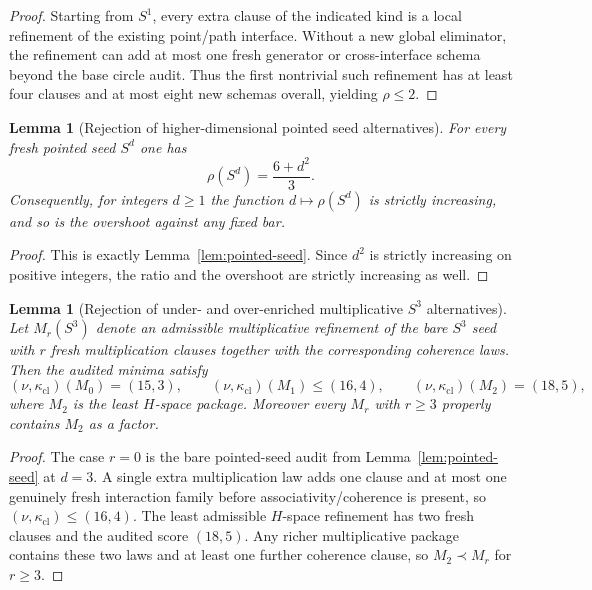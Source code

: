 \documentclass{lmcs}
\theoremstyle{plain}
\newtheorem{lem}[thm]{Lemma}
\theoremstyle{definition}
\theoremstyle{remark}
\begin{document}
\begin{proof}
Starting from $S^1$, every extra clause of the indicated kind is a local refinement of the existing point/path interface.
Without a new global eliminator, the refinement can add at most one fresh generator or cross-interface schema beyond the base circle audit.
Thus the first nontrivial such refinement has at least four clauses and at most eight new schemas overall, yielding $\rho\le 2$.
\end{proof}

\begin{lem}[Rejection of higher-dimensional pointed seed alternatives]
\label{lem:reject-pointed}
For every fresh pointed seed $S^d$ one has
\[
  \rho(S^d)=\frac{6+d^2}{3}.
\]
Consequently, for integers $d\ge 1$ the function $d\mapsto \rho(S^d)$ is strictly increasing, and so is the overshoot against any fixed bar.
\end{lem}

\begin{proof}
This is exactly Lemma~\ref{lem:pointed-seed}.
Since $d^2$ is strictly increasing on positive integers, the ratio and the overshoot are strictly increasing as well.
\end{proof}

\begin{lem}[Rejection of under- and over-enriched multiplicative $S^3$ alternatives]
\label{lem:reject-multiplicative}
Let $M_r(S^3)$ denote an admissible multiplicative refinement of the bare $S^3$ seed with $r$ fresh multiplication clauses together with the corresponding coherence laws.
Then the audited minima satisfy
\[
  (\nu,\kappa_{\mathrm{cl}})(M_0)=(15,3),\qquad
  (\nu,\kappa_{\mathrm{cl}})(M_1)\le (16,4),\qquad
  (\nu,\kappa_{\mathrm{cl}})(M_2)=(18,5),
\]
where $M_2$ is the least $H$-space package.
Moreover every $M_r$ with $r\ge 3$ properly contains $M_2$ as a factor.
\end{lem}

\begin{proof}
The case $r=0$ is the bare pointed-seed audit from Lemma~\ref{lem:pointed-seed} at $d=3$.
A single extra multiplication law adds one clause and at most one genuinely fresh interaction family before associativity/coherence is present, so $(\nu,\kappa_{\mathrm{cl}})\le(16,4)$.
The least admissible $H$-space refinement has two fresh clauses and the audited score $(18,5)$.
Any richer multiplicative package contains these two laws and at least one further coherence clause, so $M_2\prec M_r$ for $r\ge 3$.
\end{proof}
\end{document}

